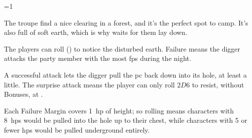 \ifnum\value{temperature}=1

\mouthdigger

The troupe find a nice clearing in a forest, and it's the perfect spot to camp.
It's also full of soft earth, which is why  waits for them lay down.

The players can roll  (\tn[10]) to notice the disturbed earth.
Failure means the \gls{digger} attacks the party member with the most \glspl{fp} during the night.

\addtocounter{tn}{\value{Brawl}}
\addtocounter{tn}{2}

A successful attack lets the \gls{digger} pull the \gls{pc} back down into its hole, at least a little.
The surprise attack means the player can only roll $2D6$ to resist, without Bonuses, at \tn.
\addtocounter{tn}{-5}
Each Failure Margin covers 1~\gls{hp} of height; so rolling  means characters with 8~\glspl{hp} would be pulled into the hole up to their chest, while characters with 5 or fewer \glspl{hp} would be pulled underground entirely.

\fi
